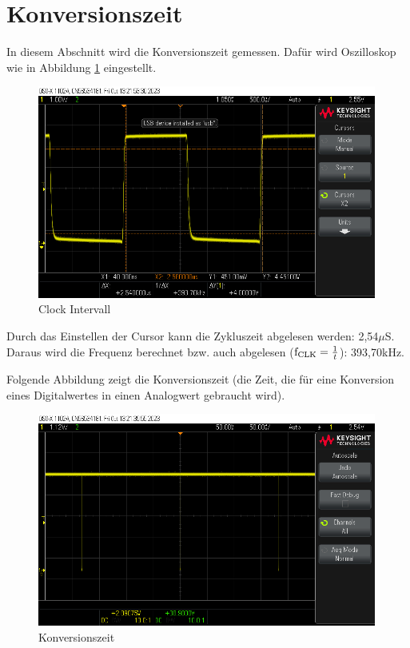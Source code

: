 \section{Konversionszeit}
In diesem Abschnitt wird die Konversionszeit gemessen. Dafür wird Oszilloskop
wie in Abbildung \ref{fig: Clock Intervall} eingestellt.

\begin{figure}[H]
	\centering
	\includegraphics[height=7cm]{images/Clock-interval.png} 
	\caption{Clock Intervall}
	\label{fig: Clock Intervall}
\end{figure}

Durch das Einstellen der Cursor kann die Zykluszeit abgelesen werden: 2,54$\mu$S.
Daraus wird die Frequenz berechnet bzw. auch abgelesen ($\text{f\textsubscript{CLK}}=\frac{1}{t}$): 
393,70kHz.\par

Folgende Abbildung zeigt die Konversionszeit (die Zeit, die für eine Konversion
eines Digitalwertes in einen Analogwert gebraucht wird).

\begin{figure}[H]
	\centering
	\includegraphics[height=7cm]{images/Conversion-Time.png} 
	\caption{Konversionszeit}
	\label{fig: Konversionszeit}
\end{figure}

